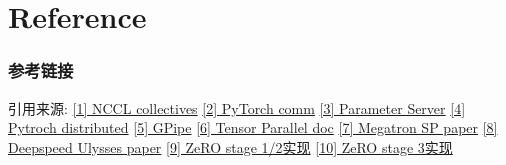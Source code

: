 \documentclass{beamer}
\begin{document}

\section{Reference}

\begin{frame}[fragile]
\frametitle{参考链接}

引用来源:\newline
\href{https://docs.nvidia.com/deeplearning/nccl/user-guide/docs/usage/collectives.html}{\color{blue}[1] NCCL collectives}\newline
\href{https://pytorch.org/tutorials/intermediate/dist_tuto.html#communication-backends}{\color{blue}[2] PyTorch comm}\newline
\href{https://www.usenix.org/system/files/conference/osdi14/osdi14-paper-li_mu.pdf}{\color{blue}[3] Parameter Server}\newline
\href{https://arxiv.org/pdf/2006.15704}{\color{blue}[4] Pytroch distributed}\newline
\href{https://arxiv.org/pdf/1811.06965}{\color{blue}[5] GPipe}\newline
\href{https://lightning.ai/docs/fabric/2.4.0/advanced/model_parallel/tp.html}{\color{blue}[6] Tensor Parallel doc}\newline
\href{https://arxiv.org/pdf/2205.05198}{\color{blue}[7] Megatron SP paper}\newline
\href{https://arxiv.org/pdf/2309.14509}{\color{blue}[8] Deepspeed Ulysses paper}\newline
\href{https://github.com/deepspeedai/DeepSpeed/blob/master/deepspeed/runtime/zero/stage_1_and_2.py}{\color{blue}[9] ZeRO stage 1/2实现}\newline
\href{https://github.com/deepspeedai/DeepSpeed/blob/master/deepspeed/runtime/zero/stage3.py}{\color{blue}[10] ZeRO stage 3实现}\newline

\end{frame}
\end{document}
